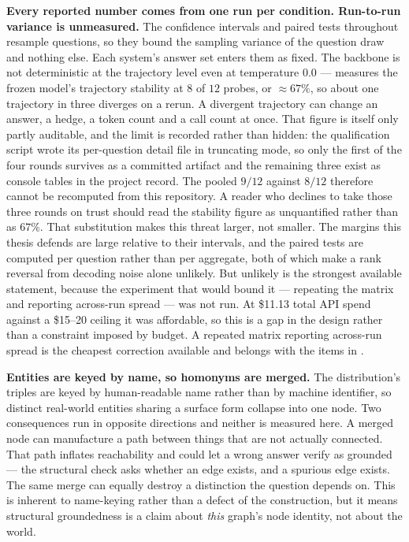 \textbf{Every reported number comes from one run per condition. Run-to-run
variance is unmeasured.} The confidence intervals and paired tests throughout
 resample questions, so they bound the sampling variance of the
question draw and nothing else. Each system's answer set enters them as fixed.
The backbone is not deterministic at the trajectory level even at temperature
$0.0$ ---  measures the frozen model's trajectory stability
at $8$ of $12$ probes, or $\approx 67\%$, so about one trajectory in three
diverges on a rerun. A divergent trajectory can change an answer, a
hedge, a token count and a call count at once. That figure is itself only partly
auditable, and the limit is recorded rather than hidden: the qualification
script wrote its per-question detail file in truncating mode, so only the first
of the four rounds survives as a committed artifact and the remaining three
exist as console tables in the project record. The pooled $9/12$ against $8/12$
therefore cannot be recomputed from this repository. A reader who declines to
take those three rounds on trust should read the stability figure as
unquantified rather than as $67\%$. That substitution makes this threat larger,
not smaller. The margins this thesis defends are large relative to their
intervals, and the paired tests are computed per question rather than per
aggregate, both of which make a rank reversal from decoding noise alone
unlikely. But unlikely is the strongest available statement, because the
experiment that would bound it --- repeating the matrix and reporting
across-run spread --- was not run. At \$11.13 total API spend against a \$15--20
ceiling it was affordable, so this is a gap in the design rather than a
constraint imposed by budget. A repeated matrix reporting across-run spread is
the cheapest correction available and belongs with the items in
.

\textbf{Entities are keyed by name, so homonyms are merged.} The distribution's
triples are keyed by human-readable name rather than by machine identifier, so
distinct real-world entities sharing a surface form collapse into one node. Two
consequences run in opposite directions and neither is measured here. A merged
node can manufacture a path between things that are not actually connected. That
path inflates reachability and could let a wrong answer verify as grounded ---
the structural check asks whether an edge exists, and a spurious edge exists.
The same merge can equally destroy a distinction the question depends on. This
is inherent to name-keying rather than a defect of the construction, but it
means structural groundedness is a claim about \emph{this} graph's node
identity, not about the world.

